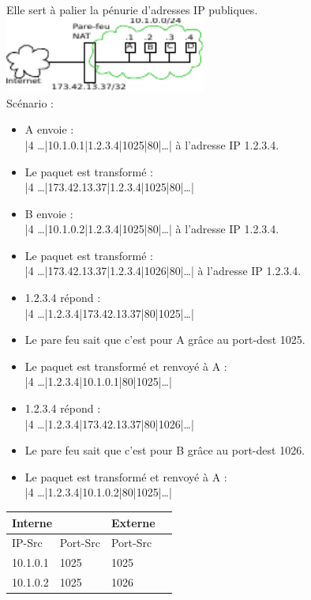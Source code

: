  Elle sert à palier la pénurie d'adresses IP publiques.\\
\includegraphics[width=250px]{Images/20_NAT.pdf}\\
Scénario : 
\begin{itemize}
	\item A envoie : \\|4 \ldots|10.1.0.1|1.2.3.4|1025|80|\ldots| à l'adresse IP 1.2.3.4.
	\item Le paquet est transformé : \\|4 \ldots|173.42.13.37|1.2.3.4|1025|80|\ldots|
	\item B envoie : \\|4 \ldots|10.1.0.2|1.2.3.4|1025|80|\ldots| à l'adresse IP 1.2.3.4.
	\item Le paquet est transformé : \\|4 \ldots|173.42.13.37|1.2.3.4|1026|80|\ldots| à l'adresse IP 1.2.3.4.
	\item 1.2.3.4 répond : \\|4 \ldots|1.2.3.4|173.42.13.37|80|1025|\ldots|
	\item Le pare feu sait que c'est pour A grâce au port-dest 1025.
	\item Le paquet est transformé et renvoyé à A : \\|4 \ldots|1.2.3.4|10.1.0.1|80|1025|\ldots|
	\item 1.2.3.4 répond : \\|4 \ldots|1.2.3.4|173.42.13.37|80|1026|\ldots|
	\item Le pare feu sait que c'est pour B grâce au port-dest 1026.
	\item Le paquet est transformé et renvoyé à A : \\|4 \ldots|1.2.3.4|10.1.0.2|80|1025|\ldots|
\end{itemize}

\begin{tabular}{|l|l|l|l|} \hline
	\multicolumn{2}{|l|}{Interne} & Externe \\ \hline
	IP-Src & Port-Src & Port-Src\\ \hline
	10.1.0.1 & 1025 & 1025 \\ \hline
	10.1.0.2 & 1025 & 1026 \\ \hline
\end{tabular}

